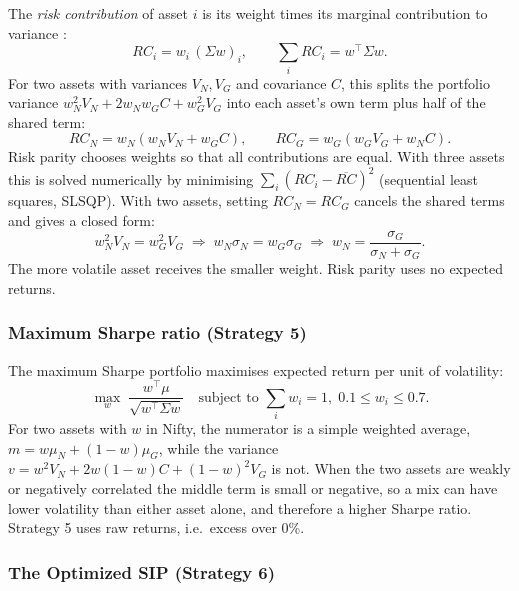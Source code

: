 The \emph{risk contribution} of asset $i$ is its weight times its marginal contribution to variance
\citep{maillard2010,qian2006}:
\begin{equation}
  RC_i = w_i\,(\Sigma w)_i, \qquad \sum_i RC_i = w^\top\Sigma w .
  \label{eq:rc}
\end{equation}
For two assets with variances $V_N, V_G$ and covariance $C$, this splits the portfolio variance
$w_N^2V_N + 2w_Nw_GC + w_G^2V_G$ into each asset's own term plus half of the shared term:
\begin{equation}
  RC_N = w_N\left(w_N V_N + w_G C\right), \qquad RC_G = w_G\left(w_G V_G + w_N C\right).
\end{equation}
Risk parity chooses weights so that all contributions are equal. With three assets this is solved
numerically by minimising $\sum_i (RC_i - \overline{RC})^2$ (sequential least squares, SLSQP). With
two assets, setting $RC_N = RC_G$ cancels the shared terms and gives a closed form:
\begin{equation}
  w_N^2 V_N = w_G^2 V_G \;\Rightarrow\; w_N\sigma_N = w_G\sigma_G \;\Rightarrow\;
  w_N = \frac{\sigma_G}{\sigma_N + \sigma_G}.
  \label{eq:rp2}
\end{equation}
The more volatile asset receives the smaller weight. Risk parity uses no expected returns.

\subsubsection{Maximum Sharpe ratio (Strategy 5)}
\label{sec:maxsharpe}

The maximum Sharpe portfolio maximises expected return per unit of volatility:
\begin{equation}
  \max_w \; \frac{w^\top \mu}{\sqrt{w^\top \Sigma w}} \quad \text{subject to } \textstyle\sum_i w_i = 1,\; 0.1 \le w_i \le 0.7 .
  \label{eq:ms}
\end{equation}
For two assets with $w$ in Nifty, the numerator is a simple weighted average,
$m = w\mu_N + (1-w)\mu_G$, while the variance
$v = w^2V_N + 2w(1-w)C + (1-w)^2V_G$ is not. When the two assets are weakly or negatively correlated
the middle term is small or negative, so a mix can have lower volatility than either asset alone,
and therefore a higher Sharpe ratio. Strategy 5 uses raw returns, i.e.\ excess over 0\%.

\subsubsection{The Optimized SIP (Strategy 6)}

